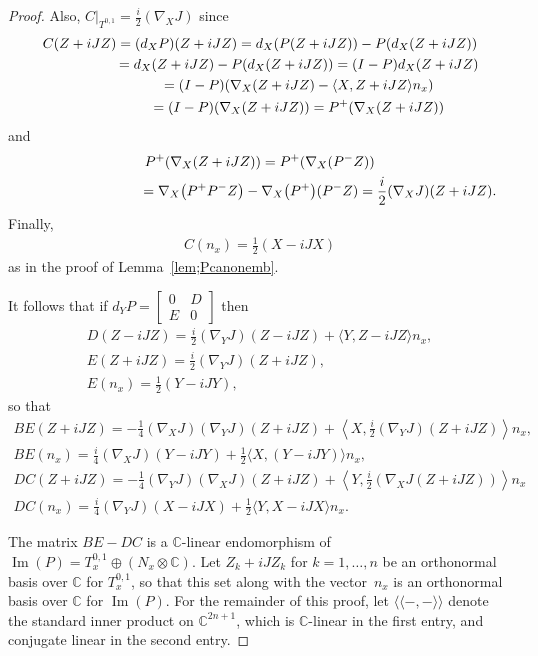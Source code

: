 \documentclass[pdftex]{sigma}
\numberwithin{equation}{section}
\newcommand{\CC}{\mathbb{C}}
\begin{document}
\begin{proof}
Also, $C \big|_{T^{0,1}} = \frac{i}{ 2} (\nabla_X J) $ since
\begin{gather*}
C(Z+iJZ) = (d_X P)(Z+iJZ) = d_X(P(Z + iJZ)) - P(d_X(Z+iJZ)) \\
\hphantom{C(Z+iJZ)}{} =d_X(Z + iJZ) - P(d_X(Z+iJZ)) = (I-P)d_X (Z+iJZ) \\
\hphantom{C(Z+iJZ)}{} = (I-P) ( \nabla_X (Z+iJZ) - \langle X,Z + iJZ \rangle n_x ) \\
\hphantom{C(Z+iJZ)}{} =(I-P) ( \nabla_X (Z+iJZ) ) = P^+ ( \nabla_X (Z+iJZ))
\end{gather*}
and
\begin{gather*}
 P^+ ( \nabla_X (Z+iJZ) ) = P^+ ( \nabla_X (P^- Z) ) \\
 \hphantom{P^+ ( \nabla_X (Z+iJZ) )}{} = \nabla_X \big( P^+ P^- Z\big)- \nabla_X\big(P^+\big) (P^-Z) = \frac{i}{2} (\nabla_X J) (Z + i J Z).
 \end{gather*}
 Finally,
\begin{gather*}
C(n_x) = \frac 1 2 (X - i J X)
\end{gather*}
as in the proof of Lemma~\ref{lem;Pcanonemb}.

It follows that if $d_YP =\left[
\begin{smallmatrix}
0 & D \\
E& 0
\end{smallmatrix}\right]$ then
\begin{gather*}
D(Z-iJZ) = \frac i 2 (\nabla_Y J) (Z-iJZ) + \langle Y , Z-iJZ \rangle n_x, \\
E (Z+iJZ) = \frac{i}{ 2} (\nabla_Y J)(Z+iJZ) ,\\
E(n_x) = \frac 1 2 (Y - i J Y),
\end{gather*}
so that
\begin{gather*}
BE (Z+iJZ) = -\frac{1}{4} (\nabla_X J) (\nabla_Y J)(Z+iJZ) + \left\langle X , \frac{i}{ 2} (\nabla_Y J)(Z+iJZ) \right\rangle n_x, \\
BE(n_x) = \frac i 4 (\nabla_X J) (Y - i J Y) + \frac 1 2 \langle X , (Y - i J Y) \rangle n_x, \\
DC(Z+iJZ) = -\frac{1}{4} (\nabla_Y J) (\nabla_X J)(Z+iJZ) + \left\langle Y , \frac{i}{ 2} ( \nabla_X J (Z+iJZ)) \right\rangle n_x \\
DC(n_x) = \frac i 4 (\nabla_Y J) (X-iJX) + \frac 1 2\langle Y , X-iJX \rangle n_x.
\end{gather*}

The matrix $BE-DC$ is a $\CC$-linear endomorphism of $\operatorname{Im}(P) = T^{0,1}_x \oplus (N_x \otimes \CC)$. Let $Z_k + i J Z_k$ for $k=1,\ldots ,n$ be an orthonormal basis over $\CC$ for $T^{0,1}_x$, so that this set along with the vector~$n_x$ is an orthonormal basis over $\CC$ for $\operatorname{Im}(P)$. For the remainder of this proof, let $\langle\langle - , - \rangle\rangle $ denote the standard inner product on $\CC^{2n+1}$, which is $\CC$-linear in the first entry, and conjugate linear in the second entry.


\end{proof}
\end{document}

